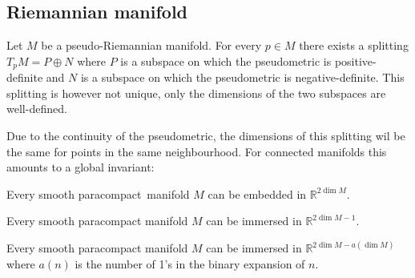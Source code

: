 \subsection{Riemannian manifold}

	
	
	\begin{property}
		Let $M$ be a pseudo-Riemannian manifold. For every $p\in M$ there exists a splitting $T_pM = P\oplus N$ where $P$ is a subspace on which the pseudometric is positive-definite and $N$ is a subspace on which the pseudometric is negative-definite. This splitting is however not unique, only the dimensions of the two subspaces are well-defined.
	\end{property}
	Due to the continuity of the pseudometric, the dimensions of this splitting wil be the same for points in the same neighbourhood. For connected manifolds this amounts to a global invariant:
	
	\begin{theorem}
		Every smooth paracompact\footnotemark\ manifold $M$ can be embedded in $\mathbb{R}^{2\dim M}$.
	\end{theorem}
	\begin{theorem}
		Every smooth paracompact manifold $M$ can be immersed in $\mathbb{R}^{2\dim M - 1}$.
	\end{theorem}
	\begin{theorem}
		Every smooth paracompact manifold $M$ can be immersed in $\mathbb{R}^{2\dim M - a(\dim M)}$ where $a(n)$ is the number of 1's in the binary expansion of $n$.
	\end{theorem}
	
